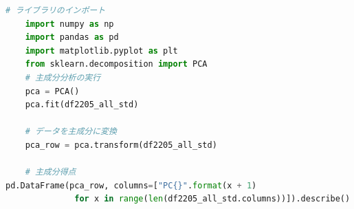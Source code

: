 \documentclass[submit,noauthor]{ono}
\begin{document}
\begin{lstlisting}[language=Python,breaklines]
	# ライブラリのインポート
	import numpy as np
	import pandas as pd
	import matplotlib.pyplot as plt
	from sklearn.decomposition import PCA
	# 主成分分析の実行
	pca = PCA()
	pca.fit(df2205_all_std)

	# データを主成分に変換
	pca_row = pca.transform(df2205_all_std)

	# 主成分得点
pd.DataFrame(pca_row, columns=["PC{}".format(x + 1)
              for x in range(len(df2205_all_std.columns))]).describe().round(2)
\end{lstlisting}

\onecolumn

\begin{figure}[tb]
	\label{fig:box100000000000000000000000000000}
\end{figure}
\end{document}
